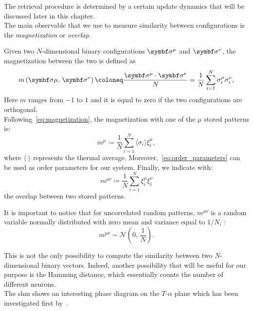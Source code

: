 \documentclass[\rootdir/main.tex]{subfiles}
\begin{document}
The retrieval procedure is determined by a certain update dynamics that will be discussed later in this chapter.\\
The main observable that we use to measure similarity between configurations is the \emph{magnetization} or \emph{overlap}.
\begin{definition}[Magnetization]
Given two $N$-dimensional binary configurations $\bsigma^\mu$ and $\bsigma^\nu$, the magnetization between the two is defined as
\begin{equation}\label{eq:magnetization}
    m\left(\bsigma\mu, \, \bsigma^\nu \right) \coloneq \frac{\bsigma^\mu \cdot \bsigma^\nu}{N} = \frac{1}{N} \sum_{i = 1}^{N} \sigma_i^\mu \sigma_i^\nu,
\end{equation}
Here $m$ ranges from $-1$ to $1$ and it is equal to zero if the two configurations are orthogonal.\\
Following~\cref{eq:magnetization}, the magnetization with one of the $\mu$ stored patterns is:
\begin{equation}\label{eq:order_parameters}
    m^\mu \coloneq \frac{1}{N}\sum_{i = 1}^N \langle \sigma_i \rangle \xi_i^\mu,
\end{equation}
where $\langle \cdot \rangle$ represents the thermal average. Moreover,~\cref{eq:order_parameters} can be used as order parameters for our system.
Finally, we indicate with:
\begin{equation}
    m^{\mu \nu} \coloneq \frac{1}{N} \sum_{i = 1}^{N} \xi_{i}^{\mu} \xi_{i}^{\nu}
\end{equation}
the overlap between two stored patterns.
\end{definition}
\begin{remark}
It is important to notice that for uncorrelated random patterns, $m^{\mu \nu}$ is a random variable normally distributed with zero mean and variance equal to $1/N$, \ie:
\begin{equation}
    m^{\mu \nu} \sim \mathcal{N} \left( 0, \, \frac{1}{N} \right).
\end{equation}
\end{remark}
This is not the only possibility to compute the similarity between two $N$-dimensional binary vectors. Indeed, another possibility that will be useful for our purpose is the Hamming distance, which essentially counts the number of different neurons.\\
The \acrlong{shm} shows an interesting phase diagram on the $T$-$\alpha$ plane which has been investigated first by~\textcite{amit_phase}.\\
\end{document}
